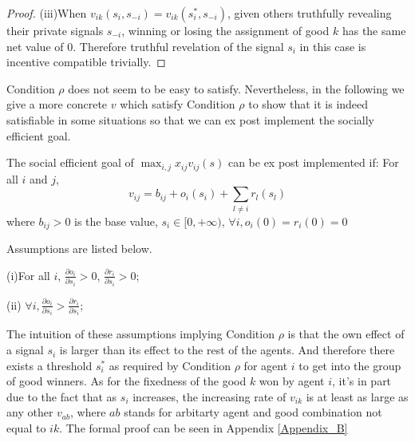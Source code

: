 \begin{proof}
(iii)When $v_{ik}(s_i, s_{-i}) = v_{ik}(s_i^*, s_{-i})$, given others
truthfully revealing their private signals $s_{-i}$, winning or losing
the assignment of good $k$ has the same net value of 0. Therefore
truthful revelation of the signal $s_i$ in this case is incentive
compatible trivially.

\end{proof}

Condition $\rho$ does not seem to be easy to satisfy. Nevertheless, in
the following we give a more concrete $v$ which satisfy Condition
$\rho$ to show that it is indeed satisfiable in some situations so
that we can ex post implement the socially efficient goal.
\begin{prop}
  \label{rho}
  The social efficient goal of $\max_{i,j}x_{ij}v_{ij}(s)$ can be ex post implemented if:
For all $i$ and $j$,
$$v_{ij}=b_{ij} + o_i(s_i) + \sum_{l \not = i} r_l(s_l) $$
where $b_{ij}>0$ is the base value, $s_i \in [0, + \infty)$, $\forall i,o_i(0)=r_i(0)=0$

Assumptions are listed below.

(i)For all $i$, $\frac{\partial o_i}{\partial s_i} > 0$, $\frac{\partial r_i}{\partial s_i} > 0$;

(ii) $\forall i, \frac{\partial o_i}{\partial s_i}
> \frac{\partial r_i}{\partial s_i}$;

\end{prop}


The intuition of these assumptions implying Condition $\rho$ is that
the own effect of a signal $s_i$ is larger than its effect to the rest
of the agents. And therefore there exists a threshold $s_i^*$ as
required by Condition $\rho$ for agent $i$ to get into the group of
good winners. As for the fixedness of the good $k$ won by agent $i$,
it's in part due to the fact that as $s_i$ increases, the increasing
rate of $v_{ik}$ is at least as large as any other $v_{ab}$, where
$ab$ stands for arbitarty agent and good combination not equal to
$ik$. The formal proof can be seen in Appendix \ref{Appendix_B}





\begin{comment}
\parencite{Jacques88} has characterized
auctions for a single indivisible object in the case where the
bidders have information about each other which is not available to the seller, and the seller can get full extraction of the surplus in bayesian and dominant strategy auctions. 
\end{comment}




